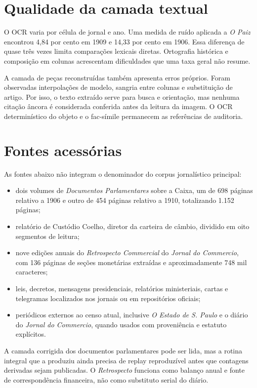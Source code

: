 \section{Qualidade da camada textual}

O OCR varia por célula de jornal e ano. Uma medida de ruído aplicada a \textit{O Paiz} encontrou 4,84 por cento em 1909 e 14,33 por cento em 1906. Essa diferença de quase três vezes limita comparações lexicais diretas. Ortografia histórica e composição em colunas acrescentam dificuldades que uma taxa geral não resume.

A camada de peças reconstruídas também apresenta erros próprios. Foram observadas interpolações de modelo, sangria entre colunas e substituição de artigo. Por isso, o texto extraído serve para busca e orientação, mas nenhuma citação âncora é considerada conferida antes da leitura da imagem. O OCR determinístico do objeto e o fac-símile permanecem as referências de auditoria.

\section{Fontes acessórias}

As fontes abaixo não integram o denominador do corpus jornalístico principal:

\begin{itemize}
  \item dois volumes de \textit{Documentos Parlamentares} sobre a Caixa, um de 698 páginas relativo a 1906 e outro de 454 páginas relativo a 1910, totalizando 1.152 páginas;
  \item relatório de Custódio Coelho, diretor da carteira de câmbio, dividido em oito segmentos de leitura;
  \item nove edições anuais do \textit{Retrospecto Commercial} do \textit{Jornal do Commercio}, com 136 páginas de seções monetárias extraídas e aproximadamente 748 mil caracteres;
  \item leis, decretos, mensagens presidenciais, relatórios ministeriais, cartas e telegramas localizados nos jornais ou em repositórios oficiais;
  \item periódicos externos ao censo atual, inclusive \textit{O Estado de S. Paulo} e o diário do \textit{Jornal do Commercio}, quando usados com proveniência e estatuto explícitos.
\end{itemize}

A camada corrigida dos documentos parlamentares pode ser lida, mas a rotina integral que a produziu ainda precisa de replay reproduzível antes que contagens derivadas sejam publicadas. O \textit{Retrospecto} funciona como balanço anual e fonte de correspondência financeira, não como substituto serial do diário.

